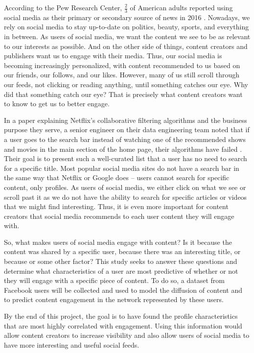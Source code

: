 According to the Pew Research Center, $\frac{2}{3}$ of American adults reported using social media as their primary or secondary source of news in 2016 \cite{pew}.  Nowadays, we rely on social media to stay up-to-date on politics, beauty, sports, and everything in between.  As users of social media, we want the content we see to be as relevant to our interests as possible.  And on the other side of things, content creators and publishers want us to engage with their media.  Thus, our social media is becoming increasingly personalized, with content recommended to us based on our friends, our follows, and our likes.  However, many of us still scroll through our feeds, not clicking or reading anything, until something catches our eye.  Why did that something catch our eye?  That is precisely what content creators want to know to get us to better engage.

In a paper explaining Netflix's collaborative filtering algorithms and the business purpose they serve, a senior engineer on their data engineering team noted that if a user goes to the search bar instead of watching one of the recommended shows and movies in the main section of the home page, their algorithms have failed \cite{netflix}.  Their goal is to present such a well-curated list that a user has no need to search for a specific title.  Most popular social media sites do not have a search bar in the same way that Netflix or Google does -- users cannot search for specific content, only profiles.  As users of social media, we either click on what we see or scroll past it as we do not have the ability to search for specific articles or videos that we might find interesting.  Thus, it is even more important for content creators that social media recommends to each user content they will engage with.

So, what makes users of social media engage with content?  Is it because the content was shared by a specific user, because there was an interesting title, or because or some other factor?  This study seeks to answer these questions and determine what characteristics of a user are most predictive of whether or not they will engage with a specific piece of content.  To do so, a dataset from Facebook users will be collected and used to model the diffusion of content and to predict content engagement in the network represented by these users.

By the end of this project, the goal is to have found the profile characteristics that are most highly correlated with engagement.  Using this information would allow content creators to increase visibility and also allow users of social media to have more interesting and useful social feeds.